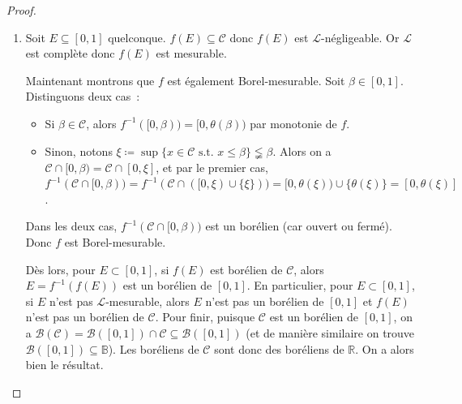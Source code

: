 \documentclass{article}
\newcommand{\st}{\text{ s.t. }}
\newcommand{\C}{\complement}
\newcommand{\R}{{\mathbb R}}
\newcommand{\B}{{\mathbb B}}
\begin{document}
\begin{proof}
\begin{enumerate}
	Posons $U \coloneqq (-1, 1/2)$ et $V \coloneqq (1/2, 2)$ (on peut remplacer $1/2$ par n'importe quel $x \in (0, 1) \setminus \mathscr C$). On a alors~:
	\begin{itemize}
		\item $U \cup V = \left((-1, 1/2) \cap \mathscr C\right) \cap \left((1/2, 2) \cap \mathscr C\right) = (-1, 2) \cap \{1/2\}^\C \cap \mathscr C
		= (-1, 2) \cap \mathscr C = \mathscr C$~;
		\item $U \cap V \subseteq (-1, 1/2) \cap (1/2, 2) = \emptyset$ donc $U \cap V = \emptyset$.
	\end{itemize}

	Puisque la connexité est une propriété topologique, que $[0, 1]$ est connexe et $\mathscr C$ ne l'est pas, on déduit que $\mathscr C$ et $[0, 1]$ ne sont pas homéomorphes.
	Donc puisque $\theta$ est bijective et continue, on a obligatoirement que $f = \theta^{-1}$ n'est pas continue.

	{\small \color{white}{Notons qu'il était franchement pas facile celui-là~: il a fallu pas mal réfléchir...}}
	\item Soit $E \subseteq [0, 1]$ quelconque. $f(E) \subseteq \mathscr C$ donc $f(E)$ est $\mathcal L$-négligeable. Or $\mathcal L$ est complète donc $f(E)$ est mesurable.

	Maintenant montrons que $f$ est également Borel-mesurable. Soit $\beta \in [0, 1]$. Distinguons deux cas~:
	\begin{itemize}
		\item Si $\beta \in \mathscr C$, alors $f^{-1}([0, \beta)) = [0, \theta(\beta))$ par monotonie de $f$.
		\item Sinon, notons $\xi \coloneqq \sup\{x \in \mathscr C \st x \leq \beta\} \lneqq \beta$. Alors on a $\mathscr C \cap [0, \beta) = \mathscr C \cap [0, \xi]$,
		et par le premier cas, $f^{-1}(\mathscr C \cap [0, \beta)) = f^{-1}(\mathscr C \cap ([0, \xi) \cup \{\xi\})) = [0, \theta(\xi)) \cup \{\theta(\xi)\} = [0, \theta(\xi)]$.
	\end{itemize}

	Dans les deux cas, $f^{-1}(\mathscr C \cap [0, \beta))$ est un borélien (car ouvert ou fermé). Donc $f$ est Borel-mesurable.

	Dès lors, pour $E \subset [0, 1]$, si $f(E)$ est borélien de $\mathscr C$, alors $E = f^{-1}(f(E))$ est un borélien de $[0, 1]$. En particulier, pour $E \subset [0, 1]$,
	si $E$ n'est pas $\mathcal L$-mesurable, alors $E$ n'est pas un borélien de $[0, 1]$ et $f(E)$ n'est pas un borélien de $\mathscr C$. Pour finir, puisque $\mathscr C$
	est un borélien de $[0, 1]$, on a $\mathcal B(\mathscr C) = \mathcal B([0, 1]) \cap \mathscr C \subseteq \mathcal B([0, 1])$ (et de manière similaire on trouve
	$\mathcal B([0, 1]) \subseteq \B$). Les boréliens de $\mathscr C$ sont donc des boréliens de $\R$. On a alors bien le résultat.
\end{enumerate}


\end{proof}
\end{document}
